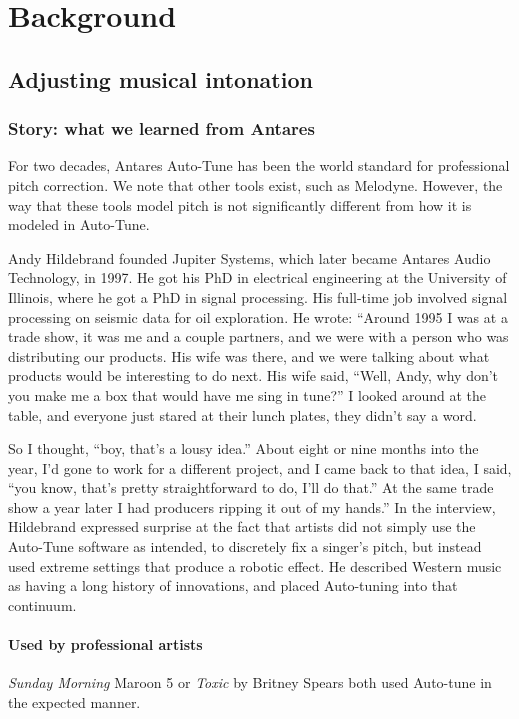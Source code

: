 \chapter{Background}

\section{Adjusting musical intonation}

\subsection{Story: what we learned from Antares}

For two decades, Antares Auto-Tune has been the world standard for professional pitch correction. We note that other tools exist, such as Melodyne. However, the way that these tools model pitch is not significantly different from how it is modeled in Auto-Tune. \cite{eckard2016}

Andy Hildebrand founded Jupiter Systems, which later became Antares Audio Technology, in 1997. He got his PhD in electrical engineering at the University of Illinois, where he got a PhD in signal processing. His full-time job involved signal processing on seismic data for oil exploration. He wrote: ``Around 1995 I was at a trade show, it was me and a couple partners, and we were with a person who was distributing our products. His wife was there, and we were talking about what products would be interesting to do next. His wife said, ``Well, Andy, why don't you make me a box that would have me sing in tune?'' I looked around at the table, and everyone just stared at their lunch plates, they didn't say a word.

So I thought, ``boy, that's a lousy idea.'' About eight or nine months into the year, I'd gone to work for a different project, and I came back to that idea, I said, ``you know, that's pretty straightforward to do, I'll do that.'' At the same trade show a year later I had producers ripping it out of my hands.'' In the interview, Hildebrand expressed surprise at the fact that artists did not simply use the Auto-Tune software as intended, to discretely fix a singer's pitch, but instead used extreme settings that produce a robotic effect. He described Western music as having a long history of innovations, and placed Auto-tuning into that continuum. 

\subsubsection{Used by professional artists}
\textit{Sunday Morning} Maroon 5 or \textit{Toxic} by Britney Spears both used Auto-tune in the expected manner. 

